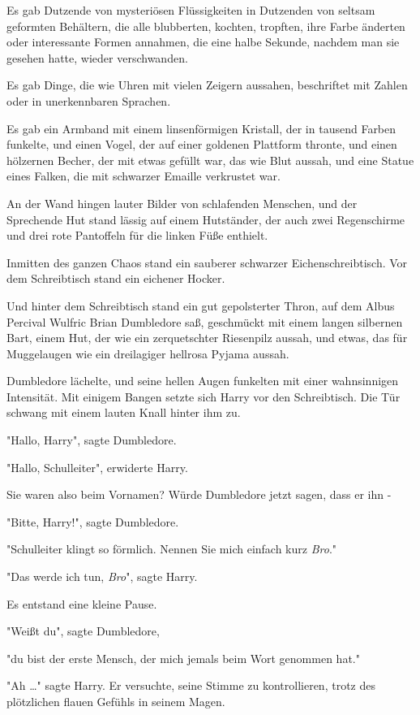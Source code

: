 {Es gab Dutzende von mysteriösen Flüssigkeiten in Dutzenden von seltsam geformten Behältern, die alle blubberten, kochten, tropften, ihre Farbe änderten oder interessante Formen annahmen, die eine halbe Sekunde, nachdem man sie gesehen hatte, wieder verschwanden.

Es gab Dinge, die wie Uhren mit vielen Zeigern aussahen, beschriftet mit Zahlen oder in unerkennbaren Sprachen.

Es gab ein Armband mit einem linsenförmigen Kristall, der in tausend Farben funkelte, und einen Vogel, der auf einer goldenen Plattform thronte, und einen hölzernen Becher, der mit etwas gefüllt war, das wie Blut aussah, und eine Statue eines Falken, die mit schwarzer Emaille verkrustet war.

An der Wand hingen lauter Bilder von schlafenden Menschen, und der Sprechende Hut stand lässig auf einem Hutständer, der auch zwei Regenschirme und drei rote Pantoffeln für die linken Füße enthielt.

Inmitten des ganzen Chaos stand ein sauberer schwarzer Eichenschreibtisch. Vor dem Schreibtisch stand ein eichener Hocker.

Und hinter dem Schreibtisch stand ein gut gepolsterter Thron, auf dem Albus Percival Wulfric Brian Dumbledore saß, geschmückt mit einem langen silbernen Bart, einem Hut, der wie ein zerquetschter Riesenpilz aussah, und etwas, das für Muggelaugen wie ein dreilagiger hellrosa Pyjama aussah.

Dumbledore lächelte, und seine hellen Augen funkelten mit einer wahnsinnigen Intensität. Mit einigem Bangen setzte sich Harry vor den Schreibtisch. Die Tür schwang mit einem lauten Knall hinter ihm zu.

"Hallo, Harry", sagte Dumbledore.

"Hallo, Schulleiter", erwiderte Harry.

Sie waren also beim Vornamen? Würde Dumbledore jetzt sagen, dass er ihn -

"Bitte, Harry!", sagte Dumbledore.

"Schulleiter klingt so förmlich. Nennen Sie mich einfach kurz \emph{Bro}."

"Das werde ich tun, \emph{Bro}", sagte Harry.

Es entstand eine kleine Pause.

"Weißt du", sagte Dumbledore,

"du bist der erste Mensch, der mich jemals beim Wort genommen hat."

"Ah …" sagte Harry. Er versuchte, seine Stimme zu kontrollieren, trotz des plötzlichen flauen Gefühls in seinem Magen.

}
